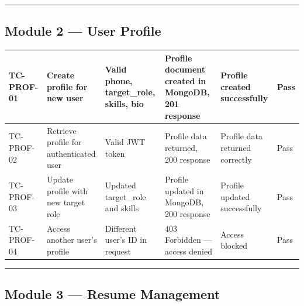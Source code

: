 \documentclass[12pt]{article}
\begin{document}
\noindent\rule{\textwidth}{0.4pt}

\subsection{Module 2 — User Profile}


\begin{longtable}{|p{}|p{}|p{}|p{}|p{}|p{}|}
\hline
\textbf{TC-PROF-01} & \textbf{Create profile for new user} & \textbf{Valid phone, target\_role, skills, bio} & \textbf{Profile document created in MongoDB, 201 response} & \textbf{Profile created successfully} & \textbf{Pass} \\ \hline
\endhead
TC-PROF-02 & Retrieve profile for authenticated user & Valid JWT token & Profile data returned, 200 response & Profile data returned correctly & Pass \\ \hline
TC-PROF-03 & Update profile with new target role & Updated target\_role and skills & Profile updated in MongoDB, 200 response & Profile updated successfully & Pass \\ \hline
TC-PROF-04 & Access another user's profile & Different user's ID in request & 403 Forbidden — access denied & Access blocked & Pass \\ \hline
\end{longtable}



\noindent\rule{\textwidth}{0.4pt}

\subsection{Module 3 — Resume Management}
\end{document}
